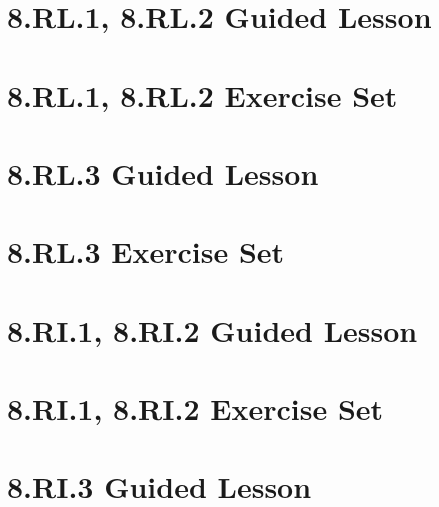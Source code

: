 \documentclass[a4paper,12pt]{article}
\title{}
\date{}
\begin{document}

\newpage

\hypertarget{toc}{}
\tableofcontents
\newpage

\pagestyle{main}

\newpage
\section{8.RL.1, 8.RL.2 Guided Lesson}


\newpage
\section{8.RL.1, 8.RL.2 Exercise Set}

\newpage


\newpage
\section{8.RL.3 Guided Lesson}


\newpage
\section{8.RL.3 Exercise Set}


\newpage
\section{8.RI.1, 8.RI.2 Guided Lesson}


\newpage
\section{8.RI.1, 8.RI.2 Exercise Set}

\newpage


\newpage
\section{8.RI.3 Guided Lesson}

\end{document}
